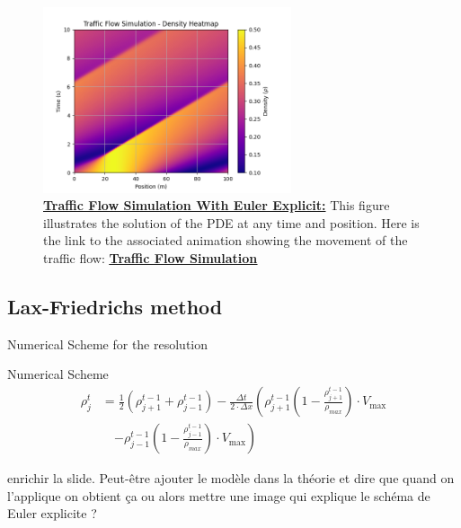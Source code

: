 \documentclass{beamer}
\begin{document}
\begin{frame}
	\begin{figure}[H]
		\centering
		\includegraphics[width=0.65\textwidth]{traffic_flow_density_map.png}
		\caption[Traffic Flow Simulation With Euler Explicit]{\textbf{\underline{Traffic Flow Simulation With Euler Explicit:}} This figure illustrates the solution of the PDE at any time and position. Here is the link to the associated animation showing the movement of the traffic flow: \href{https://github.com/FlorentGerbaud/Simple-road-traffic-modeling/blob/Flo-PDE/SRTM/EDPMethod/CasTestToLaunch/TestToLaunch/Modele_IC_S/EulerExplicit/traffic_flow_animation.gif}{\textbf{\underline{Traffic Flow Simulation}}} }
		\label{fig:traffic_flow_density_map}
	\end{figure}
\end{frame}

\subsection{Lax-Friedrichs method}
\begin{frame}{Numerical Scheme for the resolution}
	\begin{alertblock}{Numerical Scheme}
		\begin{equation*}
			\begin{split}
				\rho_{j}^t &= \frac{1}{2} \left(\rho_{j+1}^{t-1} + \rho_{j-1}^{t-1}\right) 
			 - \frac{\Delta t}{2 \cdot \Delta x} \left( \rho_{j+1}^{t-1} \left(1 - \frac{\rho_{j+1}^{t-1}}{\rho_{max}}\right) \cdot V_{\text{max}} \right. \\
				&\quad \left. - \rho_{j-1}^{t-1} \left(1 - \frac{\rho_{j-1}^{t-1}}{\rho_{max}}\right) \cdot V_{\text{max}} \right)
			\end{split}
		\end{equation*}
		
	\end{alertblock}
	enrichir la slide. Peut-être ajouter le modèle dans la théorie et dire que quand on l'applique on obtient ça ou alors mettre une image qui explique le schéma de Euler explicite ? 
	
\end{frame}
\end{document}
